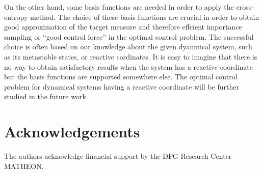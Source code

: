 \documentclass[final]{siamltex}
\begin{document}
On the other hand, some basis functions are needed in order to apply the
cross-entropy method. The choice of these basis functions are crucial in order
to obtain good approximation of the target measure and therefore effcient
importance sampling or ``good control force'' in the optimal control problem.
The successful choice is often based on our knowledge about the given dyanmical
system, such as its metastable states, or reactive cordinates. It is easy to
imagine that there is no way to obtain satisfactory results when the system
has a reactive coordinate but the basis functions are supported somewhere else.
The optimal control problem for dynamical systems having a reactive coordinate
will be further studied in the future work.

\section*{Acknowledgements}
The authors acknowledge financial support by the DFG Research Center MATHEON.
\FloatBarrier



\end{document}
